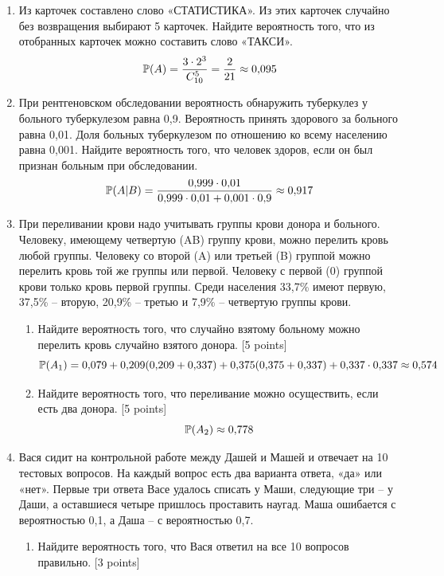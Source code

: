 \documentclass[12pt, a4paper]{article}\usepackage[]{graphicx}\usepackage[]{color}
\begin{document}
\begin{enumerate}
\item Из карточек составлено слово «СТАТИСТИКА». Из этих карточек случайно без возвращения  выбирают 5 карточек. Найдите вероятность того, что из отобранных карточек можно составить слово «ТАКСИ».
\begin{equation}
\P(A)=\frac{3\cdot 2^3}{C_{10}^{5}}=\frac{2}{21}\approx 0{,}095
\end{equation}

\item При рентгеновском обследовании вероятность обнаружить туберкулез у больного туберкулезом равна 0{,}9. Вероятность принять здорового за больного равна 0{,}01. Доля больных туберкулезом по отношению ко всему населению равна 0{,}001. Найдите вероятность того, что человек здоров, если он был признан больным при обследовании.
\begin{equation}
\P(A|B)=\frac{0{,}999\cdot 0{,}01}{0{,}999\cdot 0{,}01+0{,}001\cdot 0{,}9}\approx 0{,}917
\end{equation}
\item При переливании крови надо учитывать группы крови донора и больного. Человеку, имеющему четвертую (AB) группу крови, можно перелить кровь любой группы. Человеку со второй (A) или третьей (B) группой можно перелить кровь той же группы или первой. Человеку с первой (0) группой крови только кровь первой группы. Среди населения 33{,}7\% имеют первую, 37{,}5\% – вторую, 20{,}9\% -- третью и 7{,}9\% – четвертую группы крови.
\begin{enumerate}
\item Найдите вероятность того, что случайно взятому больному можно перелить кровь случайно взятого донора. [5 points]
\begin{equation}
\P(A_1)=0{,}079+0{,}209(0{,}209+0{,}337)+0{,}375(0{,}375+0{,}337)+0{,}337\cdot0{,}337\approx 0{,}574
\end{equation}
\item Найдите вероятность того, что переливание можно осуществить, если есть два донора. [5 points]
\begin{equation}
\P(A_2)\approx 0{,}778
\end{equation}
\end{enumerate}
\item Вася сидит на контрольной работе между Дашей и Машей и отвечает на 10 тестовых вопросов. На каждый вопрос есть два варианта ответа, «да» или «нет». Первые три ответа Васе удалось списать у Маши, следующие три -- у Даши, а оставшиеся четыре пришлось проставить наугад. Маша ошибается с вероятностью 0{,}1, а Даша -- с вероятностью 0{,}7.
\begin{enumerate}
\item Найдите вероятность того, что Вася ответил на все 10 вопросов правильно. [3 points]


\end{enumerate}
\end{enumerate}
\end{document}
